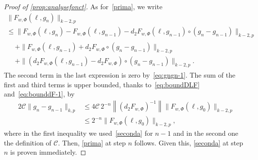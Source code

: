 \documentclass[AHL,Unicode,longabstracts,published]{cedram}
\newcommand{\clC}{\mathcal{C}}
\begin{document}
\begin{proof}[Proof of \cref{prop:analysefonct}]
As for~\eqref{prima}, we write
\begin{multline}
\|F_{w,\Phi}(\ell,g_n)\|_{k-2,p}\\
\le \big\|F_{w,\Phi}(\ell,g_n)-F_{w,\Phi}(\ell,g_{n-1})-d_2 F_{w,\Phi}(\ell,g_{n-1})\circ(g_n-g_{n-1})\big\|_{k-2,p}\\
\begin{aligned}
&+ \big\|F_{w,\Phi}(\ell,g_{n-1})+d_2 F_{w,\Phi}\circ(g_n-g_{n-1})\|_{k-2,p}\\
&+\big\|(d_2 F_{w,\Phi}(\ell,g_{n-1})-d_2F_{w,\Phi})\circ(g_n-g_{n-1})\big\|_{k-2,p}.
\end{aligned}
\end{multline}
The second term in the last expression is zero by~\eqref{eq:gngn-1}. The sum of the first and third terms is upper bounded, thanks to~\eqref{eq:boundDLF} and~\eqref{eq:bounddF-1}, by
\begin{align}
2\clC \|g_n-g_{n-1}\|_{k,p}&\le 4 \clC \, 2^{-n}\left\|(d_2 F_{w,\Phi})^{-1}\right\|
\|F_{w,\Phi}(\ell,g_0)\|_{k-2,p}\\
&\le 2^{-n}\|F_{w,\Phi}(\ell,g_0)\|_{k-2,p},
\end{align}
where in the first inequality we used~\eqref{seconda} for $n-1$ and in the second one the definition of $\clC$. Then, \eqref{prima} at step $n$ follows. Given this, \eqref{seconda} at step $n$ is proven immediately.




\end{proof}
\end{document}
